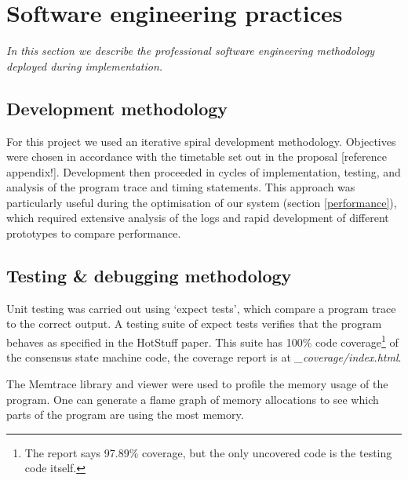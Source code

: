 
\section{Software engineering practices} \label{softwareeng}

\textit{In this section we describe the professional software engineering methodology deployed during implementation.}

\subsection{Development methodology} \label{devmethods}

For this project we used an iterative spiral development methodology. Objectives were chosen in accordance with the timetable set out in the proposal [reference appendix!]. Development then proceeded in cycles of implementation, testing, and analysis of the program trace and timing statements. This approach was particularly useful during the optimisation of our system (section \ref{performance}), which required extensive analysis of the logs and rapid development of different prototypes to compare performance.

\subsection{Testing \& debugging methodology} \label{testing}

Unit testing was carried out using `expect tests', which compare a program trace to the correct output. A testing suite of expect tests verifies that the program behaves as specified in the HotStuff paper. This suite has 100\% code coverage\footnote{The report says 97.89\% coverage, but the only uncovered code is the testing code itself.} of the consensus state machine code, the coverage report is at \textit{\_coverage/index.html}.

The Memtrace library and viewer \cite{noauthor_memtrace_nodate} were used to profile the memory usage of the program. One can generate a flame graph of memory allocations to see which parts of the program are using the most memory.


